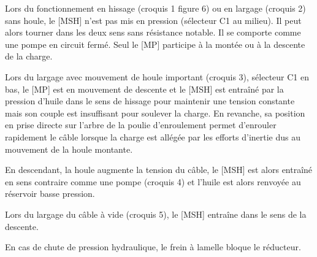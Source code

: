 \documentclass[10pt]{article}
\begin{document}
\vspace{.25cm}


\begin{minipage}[c]{.49\linewidth}
Lors du fonctionnement en hissage (croquis 1 figure 6) ou en largage (croquis 2) sans houle, le [MSH] n'est pas mis en pression (sélecteur C1 au milieu). Il peut alors tourner dans les deux sens sans résistance notable. Il se comporte comme une pompe en circuit fermé. Seul le [MP] participe à la montée ou à la descente de la charge. 

Lors du largage avec mouvement de houle important (croquis 3), sélecteur C1 en bas, le [MP] est en mouvement de descente et le [MSH] est entraîné par la pression d'huile dans le sens de hissage pour maintenir une tension constante mais son couple est insuffisant pour soulever la charge. En revanche, sa position en prise directe sur l'arbre de la poulie d'enroulement permet d'enrouler rapidement le câble lorsque la charge est allégée par les efforts d'inertie dus au mouvement de la houle montante. 

En descendant, la houle augmente la tension du câble, le [MSH] est alors entraîné en sens contraire comme une pompe (croquis 4) et l'huile est alors renvoyée au réservoir basse pression.

Lors du largage du câble à vide (croquis 5), le [MSH] entraîne dans le sens de la descente. 

En cas de chute de pression hydraulique, le frein à lamelle bloque le réducteur. 

\end{minipage} \hfill
\end{document}

